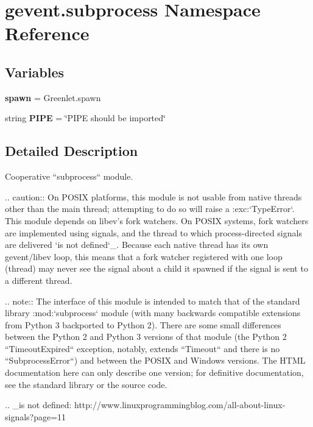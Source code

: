 \hypertarget{namespacegevent_1_1subprocess}{}\section{gevent.\+subprocess Namespace Reference}
\label{namespacegevent_1_1subprocess}
\subsection*{Variables}
\begin{DoxyCompactItemize}
\item 
\mbox{\label{namespacegevent_1_1subprocess_a6fc3729095d0fcebd27675aeeeea5c76}} 
{\bfseries spawn} = Greenlet.\+spawn
\item 
\mbox{\label{namespacegevent_1_1subprocess_a4836d7671c5f1b7400a898cc8a23f812}} 
string {\bfseries P\+I\+PE} = \char`\"{}P\+I\+PE should be imported\char`\"{}
\end{DoxyCompactItemize}


\subsection{Detailed Description}
\begin{DoxyVerb}Cooperative ``subprocess`` module.

.. caution:: On POSIX platforms, this module is not usable from native
   threads other than the main thread; attempting to do so will raise
   a :exc:`TypeError`. This module depends on libev's fork watchers.
   On POSIX systems, fork watchers are implemented using signals, and
   the thread to which process-directed signals are delivered `is not
   defined`_. Because each native thread has its own gevent/libev
   loop, this means that a fork watcher registered with one loop
   (thread) may never see the signal about a child it spawned if the
   signal is sent to a different thread.

.. note:: The interface of this module is intended to match that of
   the standard library :mod:`subprocess` module (with many backwards
   compatible extensions from Python 3 backported to Python 2). There
   are some small differences between the Python 2 and Python 3
   versions of that module (the Python 2 ``TimeoutExpired`` exception,
   notably, extends ``Timeout`` and there is no ``SubprocessError``) and between the
   POSIX and Windows versions. The HTML documentation here can only
   describe one version; for definitive documentation, see the
   standard library or the source code.

.. _is not defined: http://www.linuxprogrammingblog.com/all-about-linux-signals?page=11
\end{DoxyVerb}
 
